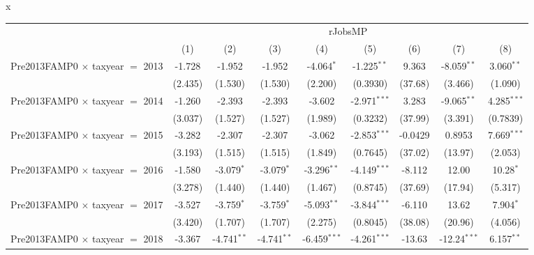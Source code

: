 x
\begingroup
\centering
\begin{tabular}{lcccccccc}
   \toprule
    & \multicolumn{8}{c}{rJobsMP}\\
                                           & (1)           & (2)            & (3)            & (4)            & (5)            & (6)           & (7)            & (8)\\  
   \midrule 
   Pre2013FAMP0 $\times$ taxyear $=$ 2013  & -1.728        & -1.952         & -1.952         & -4.064$^{*}$   & -1.225$^{**}$  & 9.363         & -8.059$^{**}$  & 3.060$^{**}$\\   
                                           & (2.435)       & (1.530)        & (1.530)        & (2.200)        & (0.3930)       & (37.68)       & (3.466)        & (1.090)\\   
   Pre2013FAMP0 $\times$ taxyear $=$ 2014  & -1.260        & -2.393         & -2.393         & -3.602         & -2.971$^{***}$ & 3.283         & -9.065$^{**}$  & 4.285$^{***}$\\   
                                           & (3.037)       & (1.527)        & (1.527)        & (1.989)        & (0.3232)       & (37.99)       & (3.391)        & (0.7839)\\   
   Pre2013FAMP0 $\times$ taxyear $=$ 2015  & -3.282        & -2.307         & -2.307         & -3.062         & -2.853$^{***}$ & -0.0429       & 0.8953         & 7.669$^{***}$\\   
                                           & (3.193)       & (1.515)        & (1.515)        & (1.849)        & (0.7645)       & (37.02)       & (13.97)        & (2.053)\\   
   Pre2013FAMP0 $\times$ taxyear $=$ 2016  & -1.580        & -3.079$^{*}$   & -3.079$^{*}$   & -3.296$^{**}$  & -4.149$^{***}$ & -8.112        & 12.00          & 10.28$^{*}$\\   
                                           & (3.278)       & (1.440)        & (1.440)        & (1.467)        & (0.8745)       & (37.69)       & (17.94)        & (5.317)\\   
   Pre2013FAMP0 $\times$ taxyear $=$ 2017  & -3.527        & -3.759$^{*}$   & -3.759$^{*}$   & -5.093$^{**}$  & -3.844$^{***}$ & -6.110        & 13.62          & 7.904$^{*}$\\   
                                           & (3.420)       & (1.707)        & (1.707)        & (2.275)        & (0.8045)       & (38.08)       & (20.96)        & (4.056)\\   
   Pre2013FAMP0 $\times$ taxyear $=$ 2018  & -3.367        & -4.741$^{**}$  & -4.741$^{**}$  & -6.459$^{***}$ & -4.261$^{***}$ & -13.63        & -12.24$^{***}$ & 6.157$^{**}$\\   

\end{tabular}
